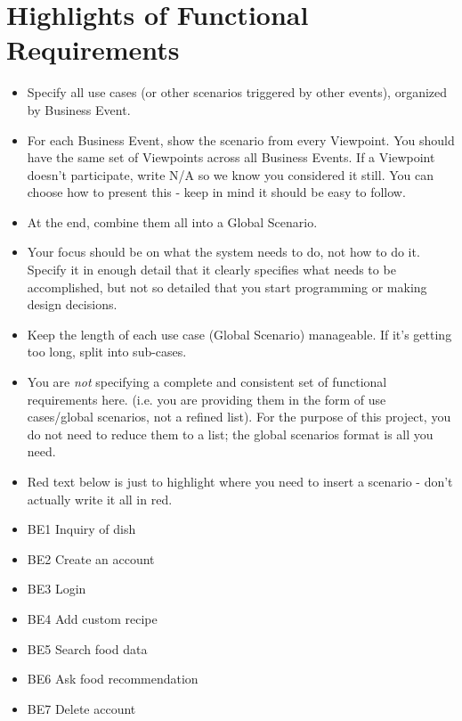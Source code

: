\documentclass[]{article}
\begin{document}
\section{Highlights of Functional Requirements}
\label{sec:functional_requirements}
\begin{itemize}
	\item Specify all use cases (or other scenarios triggered by other events), organized by Business Event. 
	\item For each Business Event, show the scenario from every Viewpoint. You should have the same set of Viewpoints across all Business Events. If a Viewpoint doesn't participate, write N/A so we know you considered it still. You can choose how to present this - keep in mind it should be easy to follow. 
	\item At the end, combine them all into a Global Scenario.
	\item Your focus should be on what the system needs to do, not how to do it. Specify it in enough detail that it clearly specifies what needs to be accomplished, but not so detailed that you start programming or making design decisions.
	\item Keep the length of each use case (Global Scenario) manageable. If it's getting too long, split into sub-cases.
	\item You are \emph{not} specifying a complete and consistent set of functional requirements here. (i.e. you are providing them in the form of use cases/global scenarios, not a refined list). For the purpose of this project, you do not need to reduce them to a list; the global scenarios format is all you need.
	\item Red text below is just to highlight where you need to insert a scenario - don't actually write it all in red.
\end{itemize}

\begin{itemize}
	\item BE1 Inquiry of dish
	\item BE2 Create an account
	\item BE3 Login
	\item BE4 Add custom recipe
	\item BE5 Search food data
	\item BE6 Ask food recommendation
	\item BE7 Delete account
\end{itemize}
\end{document}

